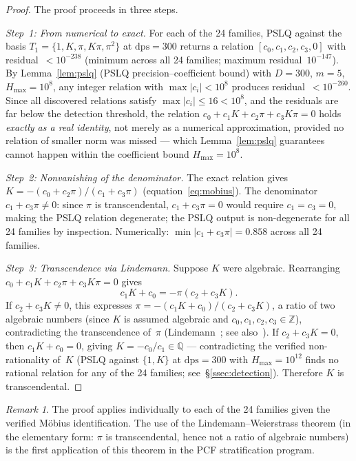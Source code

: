 \documentclass[12pt, reqno]{amsart}
\theoremstyle{definition}
\theoremstyle{remark}
\newtheorem{remark}[theorem]{Remark}
\begin{document}
\begin{proof}
The proof proceeds in three steps.

\emph{Step~1: From numerical to exact.}
For each of the 24 families, PSLQ against the basis
$T_1 = \{1, K, \pi, K\pi, \pi^2\}$ at $\mathrm{dps} = 300$ returns a relation
$[c_0, c_1, c_2, c_3, 0]$ with residual~$< 10^{-238}$
(minimum across all 24 families; maximum residual~$10^{-147}$).
By Lemma~\ref{lem:pslq} (PSLQ precision--coefficient bound) with $D = 300$,
$m = 5$, $H_{\max} = 10^8$, any integer relation with $\max|c_i| < 10^8$
produces residual~$< 10^{-260}$.
Since all discovered relations satisfy $\max|c_i| \le 16 < 10^8$,
and the residuals are far below the detection threshold,
the relation $c_0 + c_1 K + c_2\pi + c_3 K\pi = 0$
holds \emph{exactly as a real identity}, not merely as a numerical
approximation, provided no relation of smaller norm was missed ---
which Lemma~\ref{lem:pslq} guarantees cannot happen within the
coefficient bound $H_{\max} = 10^8$.

\emph{Step~2: Nonvanishing of the denominator.}
The exact relation gives $K = -(c_0 + c_2\pi)/(c_1 + c_3\pi)$
(equation~\eqref{eq:mobius}).
The denominator $c_1 + c_3\pi \ne 0$: since $\pi$ is transcendental,
$c_1 + c_3\pi = 0$ would require $c_1 = c_3 = 0$, making the PSLQ
relation degenerate; the PSLQ output is non-degenerate for all 24
families by inspection.
Numerically: $\min|c_1 + c_3\pi| = 0.858$ across all 24 families.

\emph{Step~3: Transcendence via Lindemann.}
Suppose $K$ were algebraic. Rearranging $c_0 + c_1 K + c_2\pi + c_3 K\pi = 0$ gives
\[
  c_1 K + c_0 = -\pi(c_2 + c_3 K).
\]
If $c_2 + c_3 K \ne 0$, this expresses
$\pi = -(c_1 K + c_0)/(c_2 + c_3 K)$,
a ratio of two algebraic numbers (since $K$ is assumed algebraic and
$c_0, c_1, c_2, c_3 \in \mathbb{Z}$),
contradicting the transcendence of~$\pi$
(Lindemann~\cite{lindemann}; see also~\cite{baker}).
If $c_2 + c_3 K = 0$, then $c_1 K + c_0 = 0$, giving $K = -c_0/c_1 \in \mathbb{Q}$ ---
contradicting the verified non-rationality of~$K$ (PSLQ against
$\{1, K\}$ at $\mathrm{dps} = 300$ with $H_{\max} = 10^{12}$ finds no rational relation
for any of the 24 families; see~\S\ref{ssec:detection}).
Therefore $K$ is transcendental.
\end{proof}

\begin{remark}\label{rem:LW}
The proof applies individually to each of the 24 families
given the verified M\"obius identification. The use of the Lindemann--Weierstrass
theorem (in the elementary form: $\pi$ is transcendental, hence not a ratio of
algebraic numbers) is the first application of this theorem in the PCF
stratification program.
\end{remark}
\end{document}
